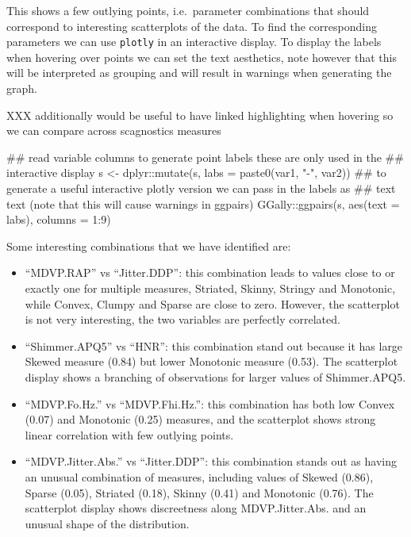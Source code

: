 This shows a few outlying points, i.e.~parameter combinations that
should correspond to interesting scatterplots of the data. To find the
corresponding parameters we can use \texttt{plotly} in an interactive
display. To display the labels when hovering over points we can set the
text aesthetics, note however that this will be interpreted as grouping
and will result in warnings when generating the graph.

XXX additionally would be useful to have linked highlighting when
hovering so we can compare across scagnostics measures

\begin{Schunk}
\begin{Sinput}
## read variable columns to generate point labels these are only used in the
## interactive display
s <- dplyr::mutate(s, labs = paste0(var1, "-", var2))
## to generate a useful interactive plotly version we can pass in the labels as
## text text (note that this will cause warnings in ggpairs)
GGally::ggpairs(s, aes(text = labs), columns = 1:9) %>% plotly::ggplotly()
\end{Sinput}
\end{Schunk}

Some interesting combinations that we have identified are:

\begin{itemize}
\tightlist
\item
  ``MDVP.RAP'' vs ``Jitter.DDP'': this combination leads to values close
  to or exactly one for multiple measures, Striated, Skinny, Stringy and
  Monotonic, while Convex, Clumpy and Sparse are close to zero. However,
  the scatterplot is not very interesting, the two variables are
  perfectly correlated.
\item
  ``Shimmer.APQ5'' vs ``HNR'': this combination stand out because it has
  large Skewed measure (0.84) but lower Monotonic measure (0.53). The
  scatterplot display shows a branching of observations for larger
  values of Shimmer.APQ5.
\item
  ``MDVP.Fo.Hz.'' vs ``MDVP.Fhi.Hz.'': this combination has both low
  Convex (0.07) and Monotonic (0.25) measures, and the scatterplot shows
  strong linear correlation with few outlying points.
\item
  ``MDVP.Jitter.Abs.'' vs ``Jitter.DDP'': this combination stands out as
  having an unusual combination of measures, including values of Skewed
  (0.86), Sparse (0.05), Striated (0.18), Skinny (0.41) and Monotonic
  (0.76). The scatterplot display shows discreetness along
  MDVP.Jitter.Abs. and an unusual shape of the distribution.
\end{itemize}

